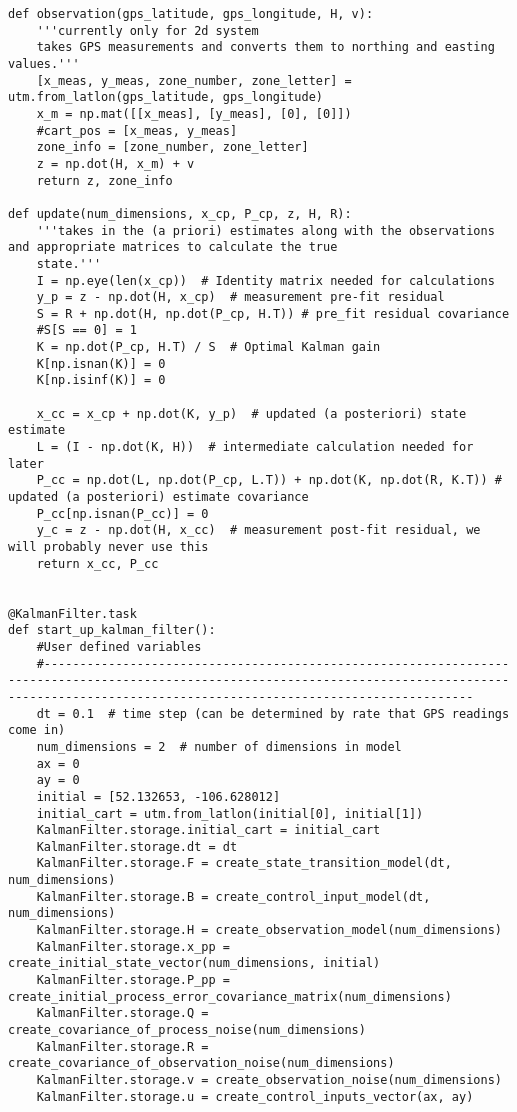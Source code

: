 \documentclass{article}
\begin{document}
\begin{lstlisting}
def observation(gps_latitude, gps_longitude, H, v):
    '''currently only for 2d system
    takes GPS measurements and converts them to northing and easting values.'''
    [x_meas, y_meas, zone_number, zone_letter] = utm.from_latlon(gps_latitude, gps_longitude)
    x_m = np.mat([[x_meas], [y_meas], [0], [0]])
    #cart_pos = [x_meas, y_meas]
    zone_info = [zone_number, zone_letter]
    z = np.dot(H, x_m) + v
    return z, zone_info

def update(num_dimensions, x_cp, P_cp, z, H, R):
    '''takes in the (a priori) estimates along with the observations and appropriate matrices to calculate the true
    state.'''
    I = np.eye(len(x_cp))  # Identity matrix needed for calculations
    y_p = z - np.dot(H, x_cp)  # measurement pre-fit residual
    S = R + np.dot(H, np.dot(P_cp, H.T)) # pre_fit residual covariance
    #S[S == 0] = 1
    K = np.dot(P_cp, H.T) / S  # Optimal Kalman gain
    K[np.isnan(K)] = 0
    K[np.isinf(K)] = 0

    x_cc = x_cp + np.dot(K, y_p)  # updated (a posteriori) state estimate
    L = (I - np.dot(K, H))  # intermediate calculation needed for later
    P_cc = np.dot(L, np.dot(P_cp, L.T)) + np.dot(K, np.dot(R, K.T)) # updated (a posteriori) estimate covariance
    P_cc[np.isnan(P_cc)] = 0
    y_c = z - np.dot(H, x_cc)  # measurement post-fit residual, we will probably never use this
    return x_cc, P_cc


@KalmanFilter.task
def start_up_kalman_filter():
    #User defined variables
    #--------------------------------------------------------------------------------------------------------------------------------------------------------------------------------------------------------
    dt = 0.1  # time step (can be determined by rate that GPS readings come in)
    num_dimensions = 2  # number of dimensions in model
    ax = 0
    ay = 0
    initial = [52.132653, -106.628012]
    initial_cart = utm.from_latlon(initial[0], initial[1])
    KalmanFilter.storage.initial_cart = initial_cart
    KalmanFilter.storage.dt = dt
    KalmanFilter.storage.F = create_state_transition_model(dt, num_dimensions)
    KalmanFilter.storage.B = create_control_input_model(dt, num_dimensions)
    KalmanFilter.storage.H = create_observation_model(num_dimensions)
    KalmanFilter.storage.x_pp = create_initial_state_vector(num_dimensions, initial)
    KalmanFilter.storage.P_pp = create_initial_process_error_covariance_matrix(num_dimensions)
    KalmanFilter.storage.Q = create_covariance_of_process_noise(num_dimensions)
    KalmanFilter.storage.R = create_covariance_of_observation_noise(num_dimensions)
    KalmanFilter.storage.v = create_observation_noise(num_dimensions)
    KalmanFilter.storage.u = create_control_inputs_vector(ax, ay)


\end{lstlisting}
\end{document}
